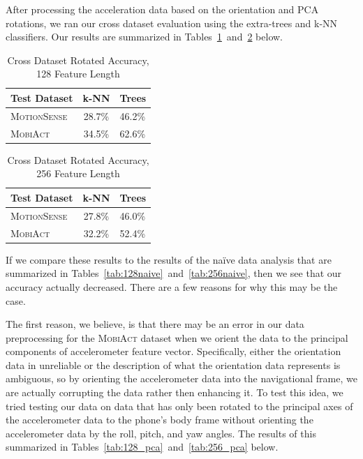 After processing the acceleration data based on the orientation and PCA rotations, we ran our cross dataset evaluation using the extra-trees and k-NN classifiers. Our results are summarized in Tables~\ref{tab:128_rot}~and~\ref{tab:256_rot} below.

\begin{table}[H]
\centering
\caption{Cross Dataset Rotated Accuracy, 128 Feature Length}
\begin{tabular}{lcl}
\toprule
\multicolumn{1}{l}{\textbf{Test Dataset}} & \multicolumn{1}{c}{\textbf{k-NN}} & \multicolumn{1}{c}{\textbf{Trees}}  \\ \midrule
\textsc{MotionSense} & 28.7\%  & 46.2\% \\
\textsc{MobiAct}     & 34.5\% & 62.6\% \\
\bottomrule
\end{tabular}
\label{tab:128_rot}
\end{table}

\begin{table}[H]
\centering
\caption{Cross Dataset Rotated Accuracy, 256 Feature Length}
\begin{tabular}{lcl}
\toprule
\multicolumn{1}{l}{\textbf{Test Dataset}} & \multicolumn{1}{c}{\textbf{k-NN}} & \multicolumn{1}{c}{\textbf{Trees}}  \\ \midrule
\textsc{MotionSense} & 27.8\% & 46.0\% \\
\textsc{MobiAct}     & 32.2\% & 52.4\% \\
\bottomrule
\end{tabular}
\label{tab:256_rot}
\end{table}

If we compare these results to the results of the na\"ive data analysis that are summarized in Tables~\ref{tab:128naive}~and~\ref{tab:256naive}, then we see that our accuracy actually decreased. There are a few reasons for why this may be the case.

The first reason, we believe, is that there may be an error in our data preprocessing for the \textsc{MobiAct} dataset when we orient the data to the principal components of accelerometer feature vector. Specifically, either the orientation data in unreliable or the description of what the orientation data represents is ambiguous, so by orienting the accelerometer data into the navigational frame, we are actually corrupting the data rather then enhancing it. To test this idea, we tried testing our data on data that has only been rotated to the principal axes of the accelerometer data to the phone's body frame without orienting the accelerometer data by the roll, pitch, and yaw angles. The results of this summarized in Tables~\ref{tab:128_pca}~and~\ref{tab:256_pca} below.

